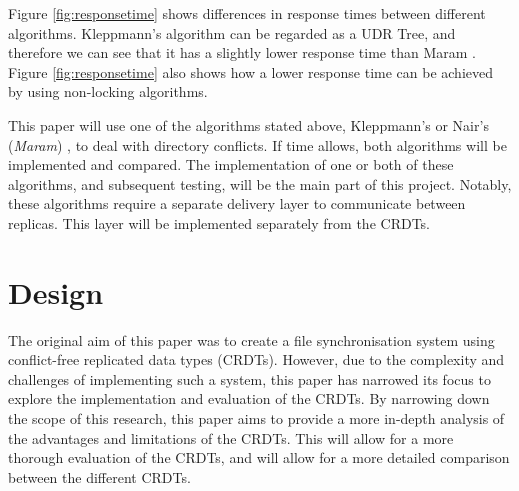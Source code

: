 \documentclass[12pt]{article}
\begin{document}
Figure \ref{fig:responsetime} shows differences in response times between different algorithms. Kleppmann's algorithm \cite{9563274} can be regarded as a UDR Tree, and therefore we can see that it has a slightly lower response time than Maram \cite{https://doi.org/10.48550/arxiv.2103.04828}. Figure \ref{fig:responsetime} also shows how a lower response time can be achieved by using non-locking algorithms.


This paper will use one of the algorithms stated above, Kleppmann's \cite{9563274} or Nair's (\textit{Maram}) \cite{https://doi.org/10.48550/arxiv.2103.04828}, to deal with directory conflicts. If time allows, both algorithms will be implemented and compared. The implementation of one or both of these algorithms, and subsequent testing, will be the main part of this project. Notably, these algorithms require a separate delivery layer to communicate between replicas. This layer will be implemented separately from the CRDTs.


\newpage
\section{Design}
The original aim of this paper was to create a file synchronisation system using conflict-free replicated data types (CRDTs). However, due to the complexity and challenges of implementing such a system, this paper has narrowed its focus to explore the implementation and evaluation of the CRDTs. By narrowing down the scope of this research, this paper aims to provide a more in-depth analysis of the advantages and limitations of the CRDTs. This will allow for a more thorough evaluation of the CRDTs, and will allow for a more detailed comparison between the different CRDTs.
\end{document}
